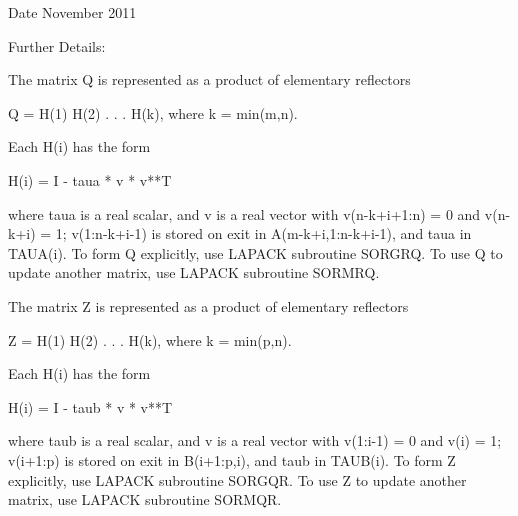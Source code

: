 \begin{DoxyDate}{Date}
November 2011 
\end{DoxyDate}
\begin{DoxyParagraph}{Further Details\+: }
\begin{DoxyVerb}  The matrix Q is represented as a product of elementary reflectors

     Q = H(1) H(2) . . . H(k), where k = min(m,n).

  Each H(i) has the form

     H(i) = I - taua * v * v**T

  where taua is a real scalar, and v is a real vector with
  v(n-k+i+1:n) = 0 and v(n-k+i) = 1; v(1:n-k+i-1) is stored on exit in
  A(m-k+i,1:n-k+i-1), and taua in TAUA(i).
  To form Q explicitly, use LAPACK subroutine SORGRQ.
  To use Q to update another matrix, use LAPACK subroutine SORMRQ.

  The matrix Z is represented as a product of elementary reflectors

     Z = H(1) H(2) . . . H(k), where k = min(p,n).

  Each H(i) has the form

     H(i) = I - taub * v * v**T

  where taub is a real scalar, and v is a real vector with
  v(1:i-1) = 0 and v(i) = 1; v(i+1:p) is stored on exit in B(i+1:p,i),
  and taub in TAUB(i).
  To form Z explicitly, use LAPACK subroutine SORGQR.
  To use Z to update another matrix, use LAPACK subroutine SORMQR.\end{DoxyVerb}
 
\end{DoxyParagraph}

